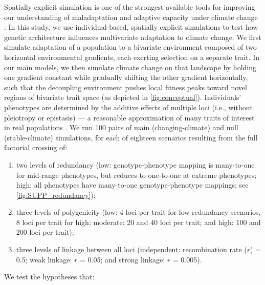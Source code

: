 \documentclass[9pt,twocolumn,twoside,lineno]{pnas-new}
\begin{document}
Spatially explicit simulation is one of the strongest available tools
for improving our understanding of maladaptation and adaptive capacity
under climate change \cite{capblancq_review}.
In this study, we use individual-based, spatially explicit simulations
to test how genetic architecture influences multivariate adaptation to climate change.
We first simulate 
adaptation of a population to a bivariate environment composed of two horizontal 
environmental gradients, each exerting selection on a separate trait.
In our main models, we then simulate climate change on that landscape by holding one gradient 
constant while gradually shifting the other gradient horizontally, such that
the decoupling environment pushes local fitness peaks toward novel regions 
of bivariate trait space (as depicted in \ref{fig:conceptual}).
Individuals' phenotypes are determined by the additive effects of multiple loci
(i.e., without pleiotropy or epistasis) ---
a reasonable approximation of many traits of interest in real populations \cite{sella}.
We run 100 pairs of main (changing-climate)
and null (stable-climate) simulations, for each of eighteen scenarios
resulting from the full factorial crossing of:
\begin{enumerate}
    \item two levels of redundancy (low: genotype-phenotype mapping is many-to-one for mid-range phenotypes, but reduces to one-to-one at extreme phenotypes; high: all phenotypes have many-to-one genotype-phenotype mappings; see \ref{fig:SUPP_redundancy});
    \item three levels of polygenicity (low: 4 loci per trait for low-redundancy scenarios, 8 loci per trait for high; moderate: 20 and 40 loci per trait; and high: 100 and 200 loci per trait);
    \item three levels of linkage between all loci (independent: recombination rate ($r$) = 0.5; weak linkage: $r$ = 0.05; and strong linkage: $r$ = 0.005).
\end{enumerate}
We test the hypotheses that:
\end{document}
